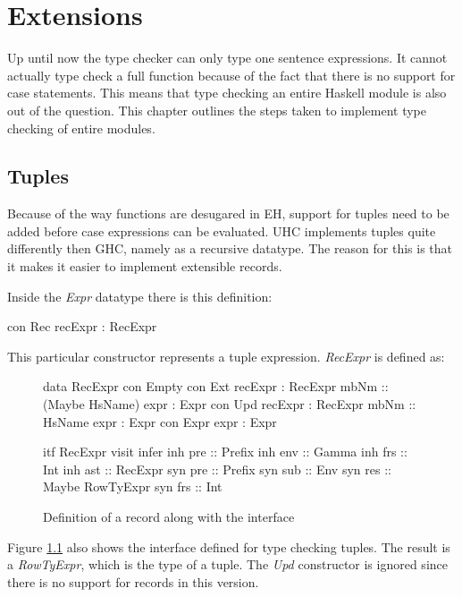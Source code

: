 \chapter{Extensions}
\label{cap:Extensions}
Up until now the type checker can only type one sentence expressions. It cannot actually type check a full function because of the fact that there is no support for case statements. This means that type checking an entire Haskell module is also out of the question. This chapter outlines the steps taken to implement type checking of entire modules.

\section{Tuples}
Because of the way functions are desugared in EH, support for tuples need to be added before case expressions can be evaluated. UHC implements tuples quite differently then GHC, namely as a recursive datatype. The reason for this is that it makes it easier to implement extensible records.

Inside the \emph{Expr} datatype there is this definition:
\begin{code}
  con Rec
    recExpr       :  RecExpr
\end{code}

This particular constructor represents a tuple expression. \emph{RecExpr} is defined as:

\begin{figure}[H]
\begin{minipage}[t]{0.5\linewidth}
\begin{code}
data RecExpr
  con Empty
  con Ext
    recExpr     :  RecExpr
    mbNm        :: (Maybe HsName)
    expr        :  Expr
  con Upd
    recExpr     :  RecExpr
    mbNm        :: HsName
    expr        :  Expr
  con Expr
    expr        :  Expr
\end{code}
\end{minipage}
\begin{minipage}[t]{0.5\linewidth}
\begin{code}
itf RecExpr
  visit infer
    inh pre  :: Prefix
    inh env  :: Gamma
    inh frs  :: Int
    inh ast  :: RecExpr
    syn pre  :: Prefix
    syn sub  :: Env
    syn res  :: Maybe RowTyExpr
    syn frs  :: Int 
\end{code}
\end{minipage}
\label{record}
\caption{Definition of a record along with the interface}
\end{figure}
Figure \ref{record} also shows the interface defined for type checking tuples. The result is a \emph{RowTyExpr}, which is the type of a tuple. The \emph{Upd} constructor is ignored since there is no support for records in this version.


